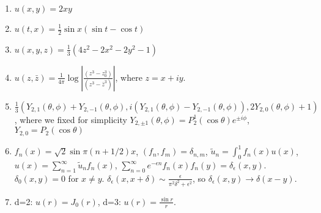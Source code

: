 \documentclass[a4paper,11pt]{article}
\begin{document}
\begin{enumerate}
\item\label{item:38} \(u(x,y) = 2 x y\)

\item\label{item:39} \(u(t,x) = \frac12 \sin x \left(\sin t-\cos t \right)\)

\item\label{item:40} \( u(x,y,z) = \frac1{3}\left( 4z^2-2x^2-2y^2-1 \right)\)

\item\label{item:41} \(u(z,\bar{z})=\frac1{4\pi}\log\left|\frac{(z^3-z_0^3)}{(z^3-\bar{z}^3)}\right|\), where \(z=x+iy\).

\item\label{item:42} \(\frac1{3}\left(Y_{2,1}(\theta,\phi)+Y_{2,-1}(\theta,\phi),i(Y_{2,1}(\theta,\phi)-Y_{2,-1}(\theta,\phi)),2Y_{2,0}(\theta,\phi)+1\right)\),
where we fixed for simplicity \(Y_{2,\pm 1}(\theta,\phi)=P_2^1(\cos\theta)e^{\pm i\phi}\), \(Y_{2,0}=P_2(\cos\theta)\)

\item\label{item:43} \(f_n(x)=\sqrt{2}\sin\pi(n+1/2)x\), \((f_n,f_m)=\delta_{n,m}\), \(\tilde{u}_n=\int_0^1 f_n(x) u(x)\), \(u(x)=\sum_{n=1}^{\infty} \tilde{u}_n f_n(x)\),
\(\sum_{n=0}^{\infty}e^{-\epsilon n}f_n(x)f_n(y)=\delta_{\epsilon}(x,y)\). \(\delta_0(x,y)=0\) for \(x\neq y\). \(\delta_{\epsilon}(x,x+\delta)\sim \frac{\epsilon}{\pi^2\delta^2+\epsilon^2}\), so \(\delta_{\epsilon}(x,y)\to \delta(x-y)\).

\item\label{item:45} d=2: \(u(r)=J_0(r)\), d=3: \(u(r)=\frac{\sin r}{r}\).

\end{enumerate}
\end{document}
